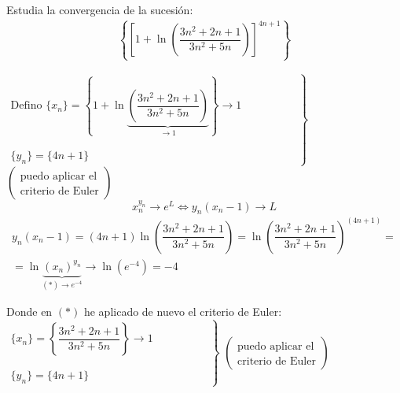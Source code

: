\documentclass[12pt]{article}
\begin{document}
    \begin{ejercicio}[2 puntos]
        Estudia la convergencia de la sucesión:
        \begin{gather*}
            \left\{ \left[ 1+\ln\left( \dfrac{3n^2 + 2n + 1 }{3n^2 + 5n} \right)\right]^{4n+1}\right\}
        \end{gather*}
        
        $\left.\begin{array}{l}
            \text{Defino } \{x_n\}= \left\{1+\ln \underbrace{\left( \dfrac{3n^2 + 2n + 1 }{3n^2 + 5n} \right)}_{\rightarrow 1} \right\}\longrightarrow 1 \\\\\\
            \{y_n\}= \{4n+1\}
        \end{array}\hspace{2cm}\right\}$  $\left( \begin{array}{c}
            \text{puedo aplicar el} \\
            \text{criterio de Euler}
        \end{array}\right)$\\

        \[
        x_n ^{y_n} \longrightarrow e^L \Longleftrightarrow y_n(x_n-1) \longrightarrow L
        \]
        \begin{gather*}
            y_n(x_n-1) = (4n+1) \ln\left( \dfrac{3n^2 + 2n + 1}{3n^2 + 5n}\right) = \ln\left( \dfrac{3n^2 + 2n + 1}{3n^2 + 5n}\right)^{(4n+1)}=\\
            =\ln\underbrace{(x_n)^{y_n}}_{(\ast) \rightarrow e^{-4}} \longrightarrow \ln(e^{-4}) = -4
        \end{gather*}

        Donde en $(\ast)$ he aplicado de nuevo el criterio de Euler:\\
    
        $\left.\begin{array}{l}
            \{x_n\} =\left\{ \dfrac{3n^2 + 2n + 1}{3n^2 + 5n}\right\} \longrightarrow 1 \\\\\\
            \{y_n\}= \{4n+1\}
        \end{array}\hspace{2cm}\right\}$  $\left( \begin{array}{c}
            \text{puedo aplicar el} \\
            \text{criterio de Euler}
        \end{array}\right)$\\


\end{ejercicio}
\end{document}
